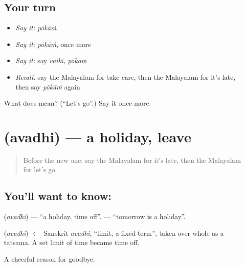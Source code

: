 \subsection*{Your turn}
\begin{itemize}
\raggedright
  \item \emph{Say it:} \emph{pōkāṁ}
  \item \emph{Say it:} \emph{pōkāṁ}, once more
  \item \emph{Say it:} say \emph{vaiki, pōkāṁ}
  \item \emph{Recall:} say the Malayalam for take care, then the Malayalam for it's late, then say \emph{pōkāṁ} again
\end{itemize}

\begin{tcolorbox}[breakable,colback=teal!4,colframe=teal!35!black,title={Before you move on}]
What does  mean? (\textquotedblleft{}Let's go\textquotedblright{}.) Say it once more.
\end{tcolorbox}
\section[\texorpdfstring{\ml{അവധി} (avadhi)}{അവധി (avadhi)}]{ (avadhi) — a holiday, leave}

\label{lesson:ML-C127-holiday}



\begin{quote}
Before the new one: say the Malayalam for it's late, then the Malayalam for let's go.
\end{quote}

\subsection*{You'll want to know: }
\textbf{} (\emph{avadhi}) — \textquotedblleft{}a holiday, time off\textquotedblright{}. \textbf{ } — \textquotedblleft{}tomorrow is a holiday\textquotedblright{}.

\begin{cousinweb}
\textbf{} (\emph{avadhi}) $\leftarrow$ Sanskrit \emph{avadhi}, \textquotedblleft{}limit, a fixed term\textquotedblright{}, taken over whole as a tatsama. A set limit of time became time off.
\end{cousinweb}

\begin{grammarlens}[title={What you've built}]
A cheerful reason for goodbye.
\end{grammarlens}

